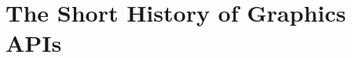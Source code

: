 \section{The Short History of Graphics APIs}\label{sec:short_history}
\begin{sectionmeta}
\end{sectionmeta}

